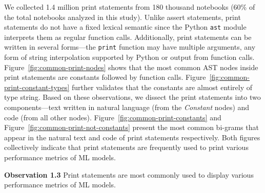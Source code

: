 \documentclass[smallextended]{svjour3}       %
\newcommand{\highlight}[1]{\begin{framed}%
  \noindent#1
\end{framed}}
\begin{document}
We collected 1.4 million print statements from 180 thousand notebooks (60\% of the total notebooks analyzed in this study). Unlike assert statements, print statements do not have a fixed lexical semantic since the Python \lstinline{ast} module interprets them as regular function calls. Additionally, print statements can be written in several forms---the \lstinline{print} function may have multiple arguments, any form of string interpolation supported by Python or output from function calls. Figure~\ref{fig:common-print-nodes} shows that the most common AST nodes inside print statements are constants followed by function calls. Figure~\ref{fig:common-print-constant-types} further validates that the constants are almost entirely of type string. Based on these observations, we dissect the print statements into two components---text written in natural language (from the \emph{Constant} nodes) and code (from all other nodes). Figure~\ref{fig:common-print-constants} and Figure~\ref{fig:common-print-not-constants} present the most common bi-grams that appear in the natural text and code of print statements respectively. Both figures collectively indicate that print statements are frequently used to print various performance metrics of ML models.

\highlight{\textbf{Observation 1.3} Print statements are most commonly used to display various performance metrics of ML models.}
\end{document}

